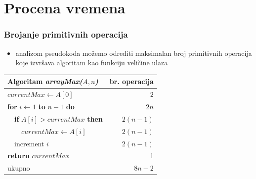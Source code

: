 \documentclass[compress]{beamer}
\begin{document}
\section[Procena]{Procena vremena}
\begin{frame}[fragile]
  \frametitle{Brojanje primitivnih operacija}
  \begin{itemize}
    \item analizom pseudokoda možemo odrediti maksimalan broj primitivnih
    operacija koje izvršava algoritam kao funkciju veličine ulaza
  \end{itemize}
  \begin{center}
    \begin{tabular}{l|r}
      \textbf{Algoritam} \textit{arrayMax($A, n$)} & \textbf{br. operacija} \\ \hline
      $currentMax \leftarrow A[0]$ & $2$ \\
      \textbf{for} $i \leftarrow 1$ \textbf{to} $n - 1$ \textbf{do} & $2n$ \\
      \ \ \textbf{if} $A[i] > currentMax$ \textbf{then} & $2(n-1)$ \\
      \ \ \ \ $currentMax \leftarrow A[i]$ & $2(n-1)$ \\
      \ \ increment $i$ & $2(n-1)$ \\
      \textbf{return} $currentMax$ & 1 \\ \hline
      \hfill ukupno & $8n-2$
    \end{tabular}
  \end{center}
\end{frame}
\end{document}
